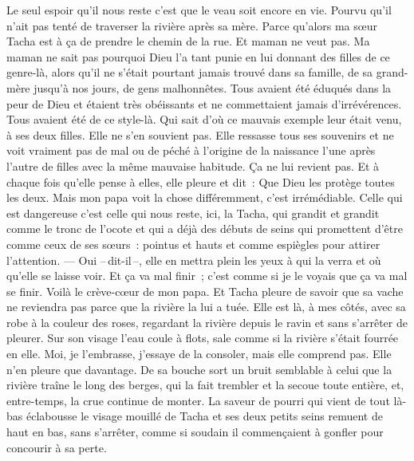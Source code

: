 \begin{pages}
\begin{Rightside}
		\pend
		\pstart
			Le seul espoir qu’il nous reste c’est que le veau soit encore en vie. Pourvu qu’il n’ait pas tenté de traverser la rivière après sa mère. Parce qu’alors ma sœur Tacha est à ça de prendre le chemin de la rue. Et maman ne veut pas.
		\pend
		\pstart
			Ma maman ne sait pas pourquoi Dieu l’a tant punie en lui donnant des filles de ce genre-là, alors qu’il ne s’était pourtant jamais trouvé dans sa famille, de sa grand-mère jusqu’à nos jours, de gens malhonnêtes. Tous avaient été éduqués dans la peur de Dieu et étaient très obéissants et ne commettaient jamais d’irrévérences. Tous avaient été de ce style-là. Qui sait d’où ce mauvais exemple leur était venu, à ses deux filles. Elle ne s’en souvient pas. Elle ressasse tous ses souvenirs et ne voit vraiment pas de mal ou de péché à l’origine de la naissance l’une après l’autre de filles avec la même mauvaise habitude. Ça ne lui revient pas. Et à chaque fois qu’elle pense à elles, elle pleure et dit : \og{}Que Dieu les protège toutes les deux.\fg
		\pend
		\pstart
			Mais mon papa voit la chose différemment, c’est irrémédiable. Celle qui est dangereuse c’est celle qui nous reste, ici, la Tacha, qui grandit et grandit comme le tronc de l’ocote et qui a déjà des débuts de seins qui promettent d’être comme ceux de ses sœurs : pointus et hauts et comme espiègles pour attirer l’attention.
		\pend
		\pstart
			--- Oui --\,dit-il\,--, elle en mettra plein les yeux à qui la verra et où qu’elle se laisse voir. Et ça va mal finir ; c’est comme si je le voyais que ça va mal se finir.
			Voilà le crève-cœur de mon papa.
		\pend
		\pstart
			Et Tacha pleure de savoir que sa vache ne reviendra pas parce que la rivière la lui a tuée. Elle est là, à mes côtés, avec sa robe à la couleur des roses, regardant la rivière depuis le ravin et sans s’arrêter de pleurer. Sur son visage l’eau coule à flots, sale comme si la rivière s’était fourrée en elle.
		\pend
		\pstart
			Moi, je l’embrasse, j’essaye de la consoler, mais elle comprend pas. Elle n’en pleure que davantage. De sa bouche sort un bruit semblable à celui que la rivière traîne le long des berges, qui la fait trembler et la secoue toute entière, et, entre-temps, la crue continue de monter. La saveur de pourri qui vient de tout là-bas éclabousse le visage mouillé de Tacha et ses deux petits seins remuent de haut en bas, sans s’arrêter, comme si soudain il commençaient à gonfler pour concourir à sa perte.
		\pend
		\endnumbering
	\end{Rightside}

\end{pages}
\Pages
